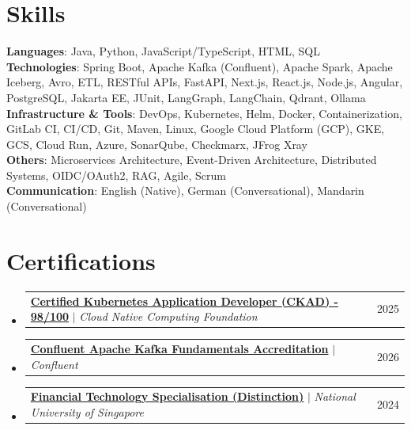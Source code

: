 \documentclass[letterpaper,10pt]{article}
\makeatletter
\newcommand{\resumeProjectHeading}[2]{
    \item
    \begin{tabular*}{0.97\textwidth}{l@{\extracolsep{\fill}}r}
      \small#1 & #2 \\
    \end{tabular*}\vspace{-3pt}
}
\newcommand{\resumeSubHeadingListStart}{\begin{itemize}[leftmargin=0.15in, label={}]}
\newcommand{\resumeSubHeadingListEnd}{\end{itemize}}
\makeatother
\begin{document}
\section{Skills}
 \begin{itemize}[leftmargin=0.15in, label={}]
    \small{\item{
     \textbf{Languages}{: Java, Python, JavaScript/TypeScript, HTML, SQL} \\
     \textbf{Technologies}{: Spring Boot, Apache Kafka (Confluent), Apache Spark, Apache Iceberg, Avro, ETL, RESTful APIs, FastAPI, Next.js, React.js, Node.js, Angular, PostgreSQL, Jakarta EE, JUnit, LangGraph, LangChain, Qdrant, Ollama} \\
     \textbf{Infrastructure \& Tools}{: DevOps, Kubernetes, Helm, Docker, Containerization, GitLab CI, CI/CD, Git, Maven, Linux, Google Cloud Platform (GCP), GKE, GCS, Cloud Run, Azure, SonarQube, Checkmarx, JFrog Xray} \\
     \textbf{Others}{: Microservices Architecture, Event-Driven Architecture, Distributed Systems, OIDC/OAuth2, RAG, Agile, Scrum} \\
     \textbf{Communication}{: English (Native), German (Conversational), Mandarin (Conversational)}
    }}
 \end{itemize}

\section{Certifications}
    \resumeSubHeadingListStart
      \resumeProjectHeading
          {\href{https://ti-user-certificates.s3.amazonaws.com/e0df7fbf-a057-42af-8a1f-590912be5460/11eb9f8b-d2de-46e0-82b0-4a2704349423-ryo-armando-wijaya-778fb699-4b16-4c9f-9c14-6e3d1fc78e51-certificate.pdf}{\textbf{Certified Kubernetes Application Developer (CKAD) - 98/100}} $|$ \emph{Cloud Native Computing Foundation}}{2025}
      \resumeProjectHeading
          {\href{https://certificates.confluent.io/a29862ce-da30-4aba-b353-b97b38259964}{\textbf{Confluent Apache Kafka Fundamentals Accreditation}} $|$ \emph{Confluent}}{2026}
      \resumeProjectHeading
          {\href{https://credentials.nus.edu.sg/b00bb0ae-8419-4336-b33e-afb88d5cc582}{\textbf{Financial Technology Specialisation (Distinction)}} $|$ \emph{National University of Singapore}}{2024}
    \resumeSubHeadingListEnd
\end{document}
